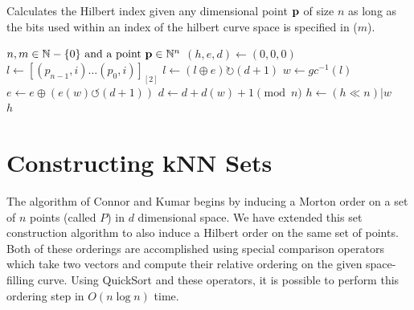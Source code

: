 \documentclass[10pt]{article}
\begin{document}
\begin{algorithm}[H]
  \caption{Calculates the Hilbert index given any dimensional point ${\bf p}$ 
    of size $n$ as long as the bits used within an index of the hilbert curve 
    space is specified in ($m$).}
  \label{hilbert-point-to-index}
  \begin{algorithmic}[1]
    \Require $n, m \in \mathbb{N} - \{0\} \text{ and a point } {\bf p} \in \mathbb{N}^n$ 
    \State $ \left( h, e, d \right) \leftarrow \left( 0, 0, 0 \right) $
    \State $ l \leftarrow \left[ \left( p_{n-1} , i \right) \ldots \left( p_0 , i \right) \right]_{\left[ 2 \right]} $ 
    \State $ l \leftarrow \left( l \oplus e \right) \rightturn \left( d+1 \right)$ 
    \State $ w \leftarrow gc^{-1} \left( l \right)$ 
    \State $ e \leftarrow e \oplus \left( e \left( w \right) \leftturn \left( d+ 1 \right) \right) $ 
    \State $ d \leftarrow d + d \left( w \right) + 1 \pmod{n}$ 
    \State $ h \leftarrow \left( h \ll n \right) | w $
    \EndFor \\
    \Return $h $%

  \end{algorithmic}
\end{algorithm}

\section{Constructing kNN Sets}

The algorithm of Connor and Kumar \cite{Connor:2010} begins by inducing a Morton order on a set of $n$ points (called $P$) in $d$ dimensional space. We have extended this set construction algorithm to also induce a Hilbert order on the same set of points. Both of these orderings are accomplished using special comparison operators which take two vectors and compute their relative ordering on the given space-filling curve. Using QuickSort and these operators, it is possible to perform this ordering step in $O(n \log{n})$ time. \\[10pt]
\end{document}
